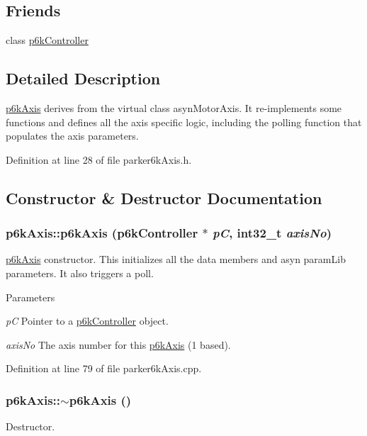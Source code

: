 \subsection*{Friends}
\begin{DoxyCompactItemize}
\item 
\hypertarget{classp6kAxis_ae13ddcf86ff676023e9a272dd4667a60}{
class \hyperlink{classp6kAxis_ae13ddcf86ff676023e9a272dd4667a60}{p6kController}}
\label{classp6kAxis_ae13ddcf86ff676023e9a272dd4667a60}

\end{DoxyCompactItemize}


\subsection{Detailed Description}
\hyperlink{classp6kAxis}{p6kAxis} derives from the virtual class asynMotorAxis. It re-\/implements some functions and defines all the axis specific logic, including the polling function that populates the axis parameters. 

Definition at line 28 of file parker6kAxis.h.

\subsection{Constructor \& Destructor Documentation}
\hypertarget{classp6kAxis_abf4a75d9d744000fd1e2477aa56d54d8}{
\subsubsection[{p6kAxis}]{\setlength{\rightskip}{0pt plus 5cm}p6kAxis::p6kAxis ({\bf p6kController} $\ast$ {\em pC}, \/  int32\_\-t {\em axisNo})}}
\label{classp6kAxis_abf4a75d9d744000fd1e2477aa56d54d8}
\hyperlink{classp6kAxis}{p6kAxis} constructor. This initializes all the data members and asyn paramLib parameters. It also triggers a poll. 
\begin{DoxyParams}{Parameters}
\item[{\em pC}]Pointer to a \hyperlink{classp6kController}{p6kController} object. \item[{\em axisNo}]The axis number for this \hyperlink{classp6kAxis}{p6kAxis} (1 based). \end{DoxyParams}


Definition at line 79 of file parker6kAxis.cpp.\hypertarget{classp6kAxis_a6ed1593d3d7a3a55f5cb7abae8b3daf1}{
\subsubsection[{$\sim$p6kAxis}]{\setlength{\rightskip}{0pt plus 5cm}p6kAxis::$\sim$p6kAxis ()}}
\label{classp6kAxis_a6ed1593d3d7a3a55f5cb7abae8b3daf1}
Destructor. 


